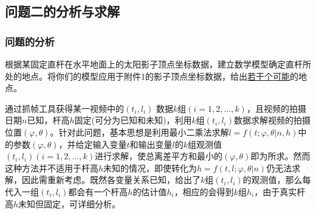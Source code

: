     \subsection{问题二的分析与求解}
        \subsubsection{问题的分析}
            \par
            根据某固定直杆在水平地面上的太阳影子顶点坐标数据，建立数学模型确定直杆所处的地点。将你们的模型应用于附件1的影子顶点坐标数据，给出\underline{若干个可能}的地点。
            \par
            通过抓帧工具获得某一视频中的$(t_i,l_i ) $ 数据$k$组$(i=1,2,\dots,k)$，且视频的拍摄日期$n$已知，杆高$h$固定(可分为已知和未知)，利用$k$组$(t_i,l_i )$数据求解视频的拍摄位置$(\varphi,\theta)$。针对此问题，基本思想是利用最小二乘法求解$l=f(t;\varphi,\theta|n,h)$中的参数$(\varphi,\theta)$，并给定输入变量$t$和输出变量$l$的$k$组观测值$(t_i,l_i )(i=1,2,\dots,k)$进行求解，使总离差平方和最小的$(\varphi,\theta)$即为所求。然而这种方法并不适用于杆高$h$未知的情况，即使转化为$h=f(t,l;\varphi,\theta|n)$仍无法求解，因此需重新考虑。既然各变量关系已知，给出了$k$组$(t_i,l_i )$的观测值，那么每代入一组$(t_i,l_i )$都会有一个杆高$h$的估计值$h_i$，相应的会得到$k$组$h_i$，由于真实杆高$h$未知但固定，可详细分析。

